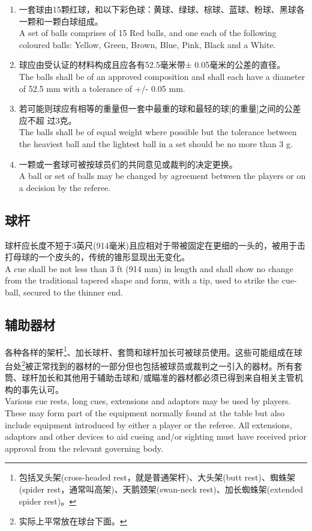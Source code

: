 \begin{enumerate}
    \item 一套球由15颗红球，和以下彩色球：黄球、绿球、棕球、蓝球、粉球、黑球各一颗和一颗白球组成。\\
    A set of balls comprises of 15 Red balls, and one each of the following coloured balls: Yellow, Green, Brown, Blue, Pink, Black and a White. 
    \item 球应由受认证的材料构成且应各有52.5毫米带± 0.05毫米的公差的直径。\\
    The balls shall be of an approved composition and shall each have a diameter of 52.5 mm with a tolerance of +/- 0.05 mm.
    \item 若可能则球应有相等的重量但一套中最重的球和最轻的球[的重量]之间的公差应不超
    过3克。\\
    The balls shall be of equal weight where possible but the tolerance between the heaviest ball and the lightest ball in a set should be no more than 3 g.
    \item 一颗或一套球可被按球员们的共同意见或裁判的决定更换。\\
    A ball or set of balls may be changed by agreement between the players or on a decision by the referee.
\end{enumerate}

\subsection{球杆}

\noindent 球杆应长度不短于3英尺(914毫米)且应相对于带被固定在更细的一头的，被用于击打母球的一个皮头的，传统的锥形显现出无变化。\\
A cue shall be not less than 3 ft (914 mm) in length and shall show no change from the traditional tapered shape and form, with a tip, used to strike the cue-ball, secured to the thinner end.

\subsection{辅助器材}

\noindent 各种各样的架杆\footnote{包括叉头架(cross-headed rest，就是普通架杆)、大头架(butt rest)、蜘蛛架(spider rest，通常叫高架)、天鹅颈架(swan-neck rest)、加长蜘蛛架(extended spider rest)。}、加长球杆、套筒和球杆加长可被球员使用。这些可能组成在球台处\footnote{实际上平常放在球台下面。}被正常找到的器材的一部分但也包括被球员或裁判之一引入的器材。所有套筒、球杆加长和其他用于辅助击球和/或瞄准的器材都必须已得到来自相关主管机构的事先认可。\\
Various cue rests, long cues, extensions and adaptors may be used by players. These may form part of the equipment normally found at the table but also include equipment introduced by either a player or the referee. All extensions, adaptors and other devices to aid cueing and/or sighting must have received prior approval from the relevant governing body.
